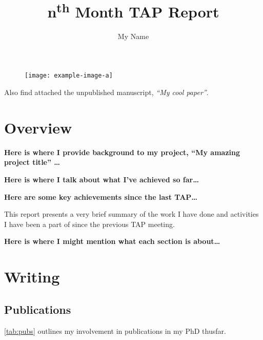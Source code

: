 \documentclass[12pt]{article}
\title{
    \textbf{\thesistitle} \\~\\
    \large n\textsuperscript{th} Month TAP Report
    }
\author{My Name}
\newcommand{\thesistitle}{My amazing project title}
\begin{document}
\maketitle
\begin{figure}[h!]%
    \centering
    \texttt{[image: example-image-a]}
\end{figure}
\tableofcontents
\bigskip
\noindent Also find attached the unpublished manuscript, \textit{``My cool paper''}.
\newpage

\pagestyle{fancy}
\rhead{\slshape\nouppercase{\leftmark}}
\lhead[E,O]{}

\section{Overview}

\textbf{Here is where I provide background to my project, ``\thesistitle'' \dots} \lipsum[1]

\textbf{Here is where I talk about what I've achieved so far\dots} \lipsum[2]

\textbf{Here are some key achievements since the last TAP\dots} \lipsum[3]

This report presents a very brief summary of the work I have done and activities I have been a part of since the previous TAP meeting.

\textbf{Here is where I might mention what each section is about\dots}

\newpage \section{Writing}\label{sec:writing}

\subsection{Publications}\label{sec:pubs}

\autoref{tab:pubs} outlines my involvement in publications in my PhD thusfar.
\end{document}

